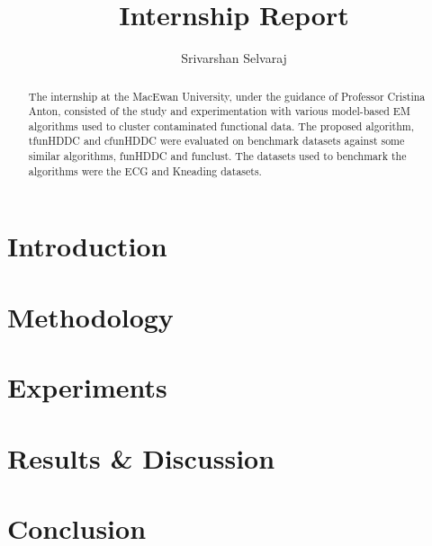 \documentclass[]{article}
\title{Internship Report}
\author{Srivarshan Selvaraj}
\begin{document}
\maketitle

\begin{abstract}
The internship at the MacEwan University, under the guidance of Professor Cristina Anton, consisted of the study and experimentation with various model-based EM algorithms used to cluster contaminated functional data. The proposed algorithm, tfunHDDC and cfunHDDC were evaluated on benchmark datasets against some similar algorithms, funHDDC and funclust. The datasets used to benchmark the algorithms were the ECG and Kneading datasets.
\end{abstract}

\section{Introduction}

\section{Methodology}

\section{Experiments}

\section{Results \& Discussion}

\section{Conclusion}
\end{document}
